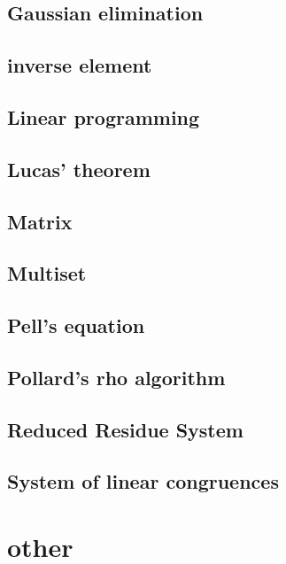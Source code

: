 \documentclass[a4paper,5pt,twocolumn,titlepage]{article}
\begin{document}
\subsection{Gaussian elimination}

\subsection{inverse element}

\subsection{Linear programming}

\subsection{Lucas' theorem}

\subsection{Matrix}

\subsection{Multiset}

\subsection{Pell's equation}

\subsection{Pollard's rho algorithm}

\subsection{Reduced Residue System}

\subsection{System of linear congruences}

\section{other}
\end{document}
